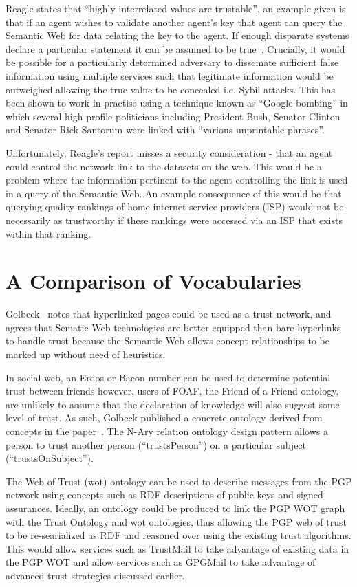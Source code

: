\documentclass{acm_proc_article-sp}
\begin{document}
Reagle states that ``highly interrelated values are trustable'', an example given is that if an agent wishes to validate another agent's key that agent can query the Semantic Web for data relating the key to the agent.  If enough disparate systems declare a particular statement it can be assumed to be true~\cite{reagle_key_2002}. Crucially, it would be possible for a particularly determined adversary to dissemate sufficient false information using multiple services such that legitimate information would be outweighed allowing the true value to be concealed i.e. Sybil\cite{douceur_sybil_2002} attacks.  This has been shown to work in practise using a technique known as ``Google-bombing'' in which several high profile politicians including President Bush, Senator Clinton and Senator Rick Santorum were linked with ``various unprintable phrases''\cite{tom_mcnichol_your_2004}.

Unfortunately, Reagle's report misses a security consideration - that an agent could control the network link to the datasets on the web. This would be a problem where the information pertinent to the agent controlling the link is used in a query of the Semantic Web.   An example consequence of this would be that querying quality rankings of home internet service providers (ISP) would not be necessarily as trustworthy if these rankings were accessed via an ISP that exists within that ranking.

\section{A Comparison of Vocabularies}
Golbeck~\cite{golbeck_trust_2003} notes that hyperlinked pages could be used as a trust network, and agrees that Sematic Web technologies are better equipped than bare hyperlinks to handle trust because the Semantic Web allows concept relationships to be marked up without need of heuristics.

In social web, an Erdos or Bacon number can be used to determine potential trust between friends however, users of FOAF, the Friend of a Friend ontology\cite{dan_brickley_foaf_????}, are unlikely to assume that the declaration of knowledge will also suggest some level of trust. As such, Golbeck published a concrete ontology derived from concepts in the paper~\cite{jennifer_golbeck_trust_2013}. The N-Ary relation ontology design pattern allows a person to trust another person (``trustsPerson'') on a particular subject (``trustsOnSubject'').

The Web of Trust (wot) ontology can be used to describe messages from the PGP network\cite{_web_2004} using concepts such as RDF descriptions of public keys and signed assurances.  Ideally, an ontology could be produced to link the PGP WOT graph with the Trust Ontology and wot ontologies, thus allowing the PGP web of trust to be re-searialized as RDF and reasoned over using the existing trust algorithms. This would allow services such as TrustMail to take advantage of existing data in the PGP WOT and allow services such as GPGMail to take advantage of advanced trust strategies discussed earlier.
\end{document}
